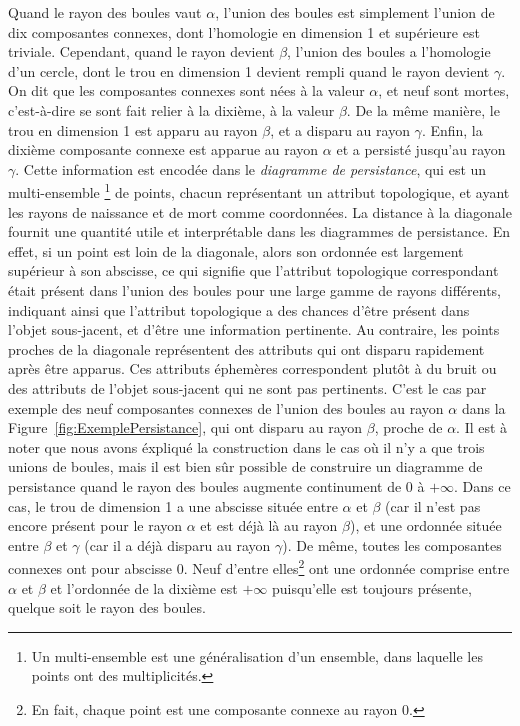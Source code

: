 Quand le rayon des boules vaut $\alpha$, l'union des boules est simplement l'union de dix composantes connexes, dont l'homologie en dimension 1
et sup\'erieure est triviale.
Cependant, quand le rayon devient $\beta$, l'union des boules a l'homologie d'un cercle, dont le trou en dimension 1
devient rempli quand le rayon devient $\gamma$. On dit que les composantes connexes sont n\'ees \`a la valeur $\alpha$,
et neuf sont mortes, c'est-\`a-dire se sont fait relier \`a la dixi\`eme, \`a la valeur $\beta$. De la m\^eme mani\`ere, le trou en dimension 1
est apparu au rayon $\beta$, et a disparu au rayon $\gamma$. Enfin, la dixi\`eme composante connexe est apparue au rayon $\alpha$
et a persist\'e jusqu'au rayon $\gamma$. Cette information est encod\'ee dans le {\em diagramme de persistance}, qui est un multi-ensemble
\footnote{Un multi-ensemble est une g\'en\'eralisation d'un ensemble, dans laquelle les points ont des multiplicit\'es.}
de points, chacun repr\'esentant
un attribut topologique, et ayant les rayons de naissance et de mort comme coordonn\'ees.
La distance \`a la diagonale fournit une quantit\'e utile et interpr\'etable dans les diagrammes de persistance. En effet, si un point est loin
de la diagonale, alors son ordonn\'ee est largement sup\'erieur \`a son abscisse, ce qui signifie que l'attribut topologique correspondant
\'etait pr\'esent dans l'union des boules pour une large gamme de rayons diff\'erents, indiquant ainsi que l'attribut topologique
a des chances d'\^etre pr\'esent dans l'objet sous-jacent, et d'\^etre une information pertinente. Au contraire, les points proches de la diagonale
repr\'esentent des attributs qui ont disparu rapidement apr\`es \^etre apparus. Ces attributs \'ephem\`eres correspondent plut\^ot \`a du bruit ou des 
attributs de l'objet sous-jacent qui ne sont pas pertinents. C'est le cas par exemple des neuf composantes connexes de l'union des boules au rayon $\alpha$
dans la    Figure~\ref{fig:ExemplePersistance}, qui ont disparu au rayon $\beta$, proche de $\alpha$.
Il est \`a noter que nous avons \'expliqu\'e la construction dans le cas o\`u il n'y a que trois unions de boules, mais il est bien s\^ur possible
de construire un diagramme de persistance quand le rayon des boules augmente continument de $0$ \`a $+\infty$.
Dans ce cas, le trou de dimension 1 a une abscisse situ\'ee entre $\alpha$ et $\beta$ (car il n'est pas encore pr\'esent pour le rayon $\alpha$
et est d\'ej\`a l\`a au rayon $\beta$), et une ordonn\'ee situ\'ee entre $\beta$ et $\gamma$ (car il a d\'ej\`a disparu au rayon $\gamma$).
De m\^eme, toutes les composantes connexes ont pour abscisse $0$. Neuf d'entre elles\footnote{En fait, chaque point est une composante connexe au rayon $0$.} 
ont une ordonn\'ee comprise  entre $\alpha$ et $\beta$
et l'ordonn\'ee de la dixi\`eme est $+\infty$ puisqu'elle est toujours pr\'esente, quelque soit le rayon des boules.

